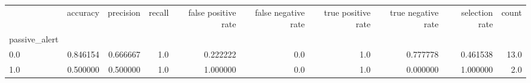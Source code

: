 \begin{tabular}{lrrrrrrrrr}
\toprule
{} &  accuracy &  precision &  recall &  false positive rate &  false negative rate &  true positive rate &  true negative rate &  selection rate &  count \\
passive\_alert &           &            &         &                      &                      &                     &                     &                 &        \\
\midrule
0.0           &  0.846154 &   0.666667 &     1.0 &             0.222222 &                  0.0 &                 1.0 &            0.777778 &        0.461538 &   13.0 \\
1.0           &  0.500000 &   0.500000 &     1.0 &             1.000000 &                  0.0 &                 1.0 &            0.000000 &        1.000000 &    2.0 \\
\bottomrule
\end{tabular}
